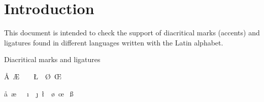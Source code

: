 \documentclass{article}
\newcommand{\DiacriticsLC}{}
\newcommand{\DiacriticsUC}{}
\newcommand\OtherGlyphsLC{\aa\ \ae\ \dh\ \dj\ \i\ \ij\ \j\ \l\ \ng\ \o\ \oe\ %
\ss\ \th\ }%
\newcommand\OtherGlyphsUC{\AA\ \AE\ \DH\ \DJ\ \IJ\ \L\ \NG\ \O\ \OE\ %
\SS\ \TH\ }%
\begin{document}
\section*{Introduction}

This document is intended to check the support of diacritical marks (accents) 
and ligatures found in different languages written with the Latin alphabet.

\begin{quiz}[points=1.0]{Diacritical marks and ligatures}
\begin{multi}{\OtherGlyphsUC}
\DiacriticsUC
\item* \DiacriticsLC
\item \OtherGlyphsLC
\end{multi}
\end{quiz}
\end{document}
